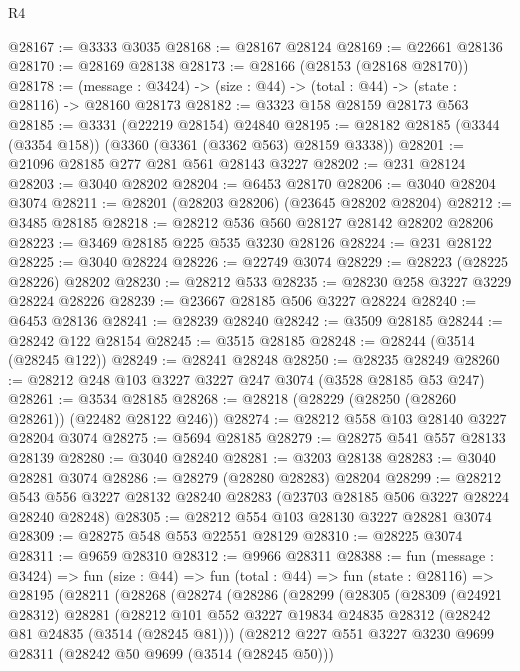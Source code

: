 \begin{lexlean}{R4}
\begin{coremodule}
@28167 := @3333 @3035
@28168 := @28167 @28124
@28169 := @22661 @28136
@28170 := @28169 @28138
@28173 := @28166 (@28153 (@28168 @28170))
@28178 := (message : @3424) -> (size : @44) -> (total : @44) -> (state : @28116) -> @28160 @28173
@28182 := @3323 @158 @28159 @28173 @563
@28185 := @3331 (@22219 @28154) @24840
@28195 := @28182 @28185 (@3344 (@3354 @158)) (@3360 (@3361 (@3362 @563) @28159 @3338))
@28201 := @21096 @28185 @277 @281 @561 @28143 @3227
@28202 := @231 @28124
@28203 := @3040 @28202
@28204 := @6453 @28170
@28206 := @3040 @28204 @3074
@28211 := @28201 (@28203 @28206) (@23645 @28202 @28204)
@28212 := @3485 @28185
@28218 := @28212 @536 @560 @28127 @28142 @28202 @28206
@28223 := @3469 @28185 @225 @535 @3230 @28126
@28224 := @231 @28122
@28225 := @3040 @28224
@28226 := @22749 @3074
@28229 := @28223 (@28225 @28226) @28202
@28230 := @28212 @533
@28235 := @28230 @258 @3227 @3229 @28224 @28226
@28239 := @23667 @28185 @506 @3227 @28224
@28240 := @6453 @28136
@28241 := @28239 @28240
@28242 := @3509 @28185
@28244 := @28242 @122 @28154
@28245 := @3515 @28185
@28248 := @28244 (@3514 (@28245 @122))
@28249 := @28241 @28248
@28250 := @28235 @28249
@28260 := @28212 @248 @103 @3227 @3227 @247 @3074 (@3528 @28185 @53 @247)
@28261 := @3534 @28185
@28268 := @28218 (@28229 (@28250 (@28260 @28261)) (@22482 @28122 @246))
@28274 := @28212 @558 @103 @28140 @3227 @28204 @3074
@28275 := @5694 @28185
@28279 := @28275 @541 @557 @28133 @28139
@28280 := @3040 @28240
@28281 := @3203 @28138
@28283 := @3040 @28281 @3074
@28286 := @28279 (@28280 @28283) @28204
@28299 := @28212
    @543
    @556
    @3227
    @28132
    @28240
    @28283
    (@23703 @28185 @506 @3227 @28224 @28240 @28248)
@28305 := @28212 @554 @103 @28130 @3227 @28281 @3074
@28309 := @28275 @548 @553 @22551 @28129
@28310 := @28225 @3074
@28311 := @9659 @28310
@28312 := @9966 @28311
@28388 := fun (message : @3424) =>
  fun (size : @44) =>
  fun (total : @44) =>
  fun (state : @28116) =>
  @28195
    (@28211
      (@28268
        (@28274
          (@28286
            (@28299
              (@28305
                (@28309
                  (@24921 @28312)
                  @28281
                  (@28212
                    @101
                    @552
                    @3227
                    @19834
                    @24835
                    @28312
                    (@28242 @81 @24835 (@3514 (@28245 @81)))
                    (@28212
                      @227
                      @551
                      @3227
                      @3230
                      @9699
                      @28311
                      (@28242 @50 @9699 (@3514 (@28245 @50)))

\end{coremodule}
\end{lexlean}
